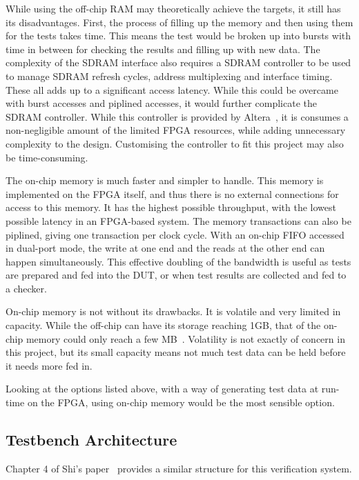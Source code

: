 \documentclass[journal]{IEEEtran}
\begin{document}
While using the off-chip RAM may theoretically achieve the targets,
it still has its disadvantages.
First, the process of filling up the memory and then using them for the tests
takes time.
This means the test would be broken up into bursts with time in between for
checking the results and filling up with new data.
The complexity of the SDRAM interface also requires a SDRAM controller to be
used to manage SDRAM refresh cycles, address multiplexing and interface timing.
These all adds up to a significant access latency.
While this could be overcame with burst accesses and piplined accesses,
it would further complicate the SDRAM controller.
While this controller is provided by Altera~\cite{Altera3}, it is consumes
a non-negligible amount of the limited FPGA resources, while adding
unnecessary complexity to the design.
Customising the controller to fit this project may also be time-consuming.

The on-chip memory is much faster and simpler to handle.
This memory is implemented on the FPGA itself, and thus there is no external
connections for access to this memory.
It has the highest possible throughput, with the lowest possible latency
in an FPGA-based system.
The memory transactions can also be piplined, giving one transaction per
clock cycle.
With an on-chip FIFO accessed in dual-port mode, the write at one end and the
reads at the other end can happen simultaneously.
This effective doubling of the bandwidth is useful as tests are prepared
and fed into the DUT, or when test results are collected and fed to a checker.

On-chip memory is not without its drawbacks.
It is volatile and very limited in capacity.
While the off-chip can have its storage reaching 1GB, that of the on-chip
memory could only reach a few MB~\cite{Altera2}.
Volatility is not exactly of concern in this project, but its small capacity
means not much test data can be held before it needs more fed in.

Looking at the options listed above, with a way of generating test data at
run-time on the FPGA, using on-chip memory would be the most sensible option.

\subsection{Testbench Architecture}



Chapter 4 of Shi's paper~\cite{Shi1} provides a similar structure for this
verification system.
\end{document}
